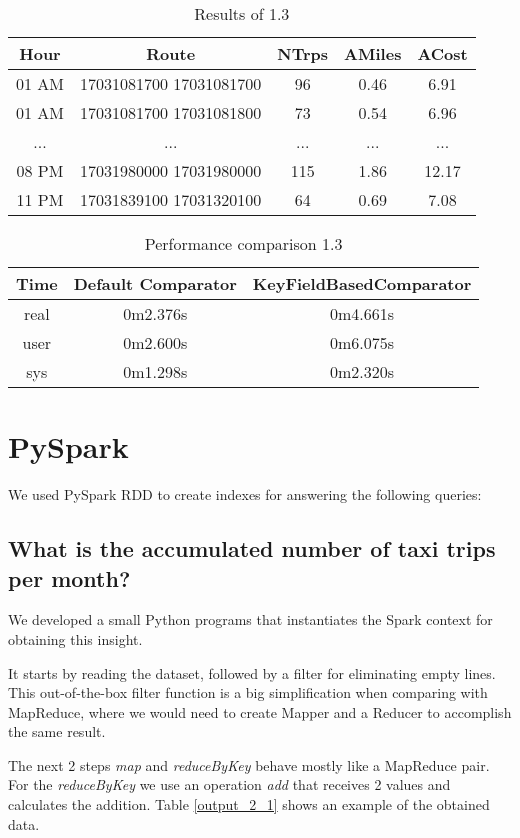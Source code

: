 \documentclass[conference,compsoc]{IEEEtran}
\begin{document}
\begin{table}[!t]
\renewcommand{\arraystretch}{1.3}
\caption{Results of 1.3}
\label{output_1_3}
\centering
\begin{tabular}{c|c||c|c|c}
\hline
\bfseries Hour & \bfseries Route & \bfseries NTrps & \bfseries AMiles & \bfseries ACost\\
\hline\hline

01 AM&17031081700 17031081700&96&0.46&6.91	\\
01 AM&17031081700 17031081800&73&0.54&6.96	\\
...&...&...&...&...	\\
08 PM&17031980000 17031980000&115&1.86&12.17\\
11 PM&17031839100 17031320100&64&0.69&7.08	\\

\hline
\end{tabular}
\end{table}

\begin{table}[!t]
\renewcommand{\arraystretch}{1.3}
\caption{Performance comparison 1.3}
\label{perf_1_4}
\centering
\begin{tabular}{c||c|c}
\hline
\bfseries Time & \bfseries Default Comparator & \bfseries KeyFieldBasedComparator \\
\hline\hline

 real & 0m2.376s           & 0m4.661s                \\
 user & 0m2.600s           & 0m6.075s                \\
 sys  & 0m1.298s           & 0m2.320s \\
\hline
\end{tabular}
\end{table}

\section{PySpark}
We used PySpark RDD to create indexes for answering the following queries:
\subsection{What is the accumulated number of taxi trips per month?}
We developed a small Python programs that instantiates the Spark context for obtaining this insight.\par It starts by reading the dataset,  followed by a filter for eliminating empty lines. This out-of-the-box filter function is a big simplification when comparing with MapReduce, where we would need to create Mapper and a Reducer to accomplish the same result.  \par
The next 2 steps \textit{map} and \textit{reduceByKey} behave mostly like a MapReduce pair. For the \textit{reduceByKey} we use an operation \textit{add} that receives 2 values and calculates the addition. Table \ref{output_2_1} shows an example of the obtained data.
\end{document}
